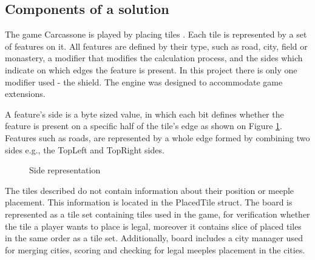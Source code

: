 \subsection{Components of a solution}

The game Carcassone is played by placing tiles \cite{CarcassoneRules}. Each tile is represented by a set of features on it. All features are defined by their type, such as road, city, field or monastery, a modifier that modifies the calculation process, and the sides which indicate on which edges the feature is present. In this project there is only one modifier used - the shield. The engine was designed to accommodate game extensions. 

A feature's side is a byte sized value, in which each bit defines whether the feature is present on a specific half of the tile's edge as shown on Figure \ref{fig:SIDES}. Features such as roads, are represented by a whole edge formed by combining two sides e.g., the TopLeft and TopRight sides.
\begin{figure}
    \centering
    \caption{Side representation} \label{fig:SIDES}
\end{figure}

The tiles described do not contain information about their position or meeple placement. This information is located in the PlacedTile struct. The board is represented as a tile set containing tiles used in the game, for verification whether the tile a player wants to place is legal,  moreover it contains slice of placed tiles in the same order as a tile set. Additionally, board includes a city manager used for merging cities, scoring and checking for legal meeples placement in the cities.

